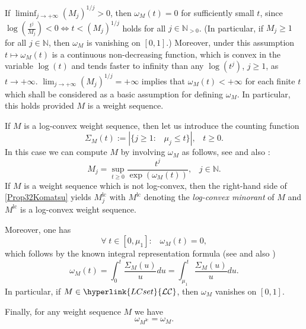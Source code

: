 \documentclass[10pt]{amsart}%
\numberwithin{equation}{section}
\theoremstyle{plain}
\newcommand{\NN}{\mathbb{N}}
\let\on=\operatorname
\begin{document}
If $\liminf_{j\rightarrow+\infty}(M_j)^{1/j}>0$, then $\omega_M(t)=0$ for sufficiently small $t$, since $\log\left(\frac{t^j}{M_j}\right)<0\Leftrightarrow t<(M_j)^{1/j}$ holds for all $j\in\NN_{>0}$. (In particular, if $M_j\ge 1$ for all $j\in\NN$, then $\omega_M$ is vanishing on $[0,1]$.) Moreover, under this assumption $t\mapsto\omega_M(t)$ is a continuous non-decreasing function, which is convex in the variable $\log(t)$ and tends faster to infinity than any $\log(t^j)$, $j\ge 1$, as $t\rightarrow+\infty$. $\lim_{j\rightarrow+\infty}(M_j)^{1/j}=+\infty$ implies that $\omega_M(t)<+\infty$ for each finite $t$ which shall be considered as a basic assumption for defining $\omega_M$. In particular, this holds provided $M$ is a weight sequence.\vspace{6pt}

If $M$ is a log-convex weight sequence, then let us introduce the counting function
\begin{equation}\label{counting}
\Sigma_{M}(t):=|\{j\ge 1:\;\;\;\mu_j\le t\}|,\;\;\;t\ge 0.
\end{equation}
In this case we can compute $M$ by involving $\omega_M$ as follows, see \cite[Chapitre I, 1.4, 1.8]{mandelbrojtbook} and also \cite[Prop. 3.2]{Komatsu73}:
\begin{equation}\label{Prop32Komatsu}
M_j=\sup_{t\ge 0}\frac{t^j}{\exp(\omega_{M}(t))},\;\;\;j\in\NN.
\end{equation}
If $M$ is a weight sequence which is not log-convex, then the right-hand side of \eqref{Prop32Komatsu} yields $M^{\on{lc}}_j$ with $M^{\on{lc}}$ denoting the {\itshape log-convex minorant} of $M$ and $M^{\on{lc}}$ is a log-convex weight sequence.

Moreover, one has
\begin{equation*}\label{assovanishing}
\forall\;t\in[0,\mu_1]:\;\;\;\omega_M(t)=0,
\end{equation*}
which follows by the known integral representation formula (see \cite[1.8. III]{mandelbrojtbook} and also \cite[$(3.11)$]{Komatsu73})
\begin{equation}\label{assointrepr}
\omega_M(t)=\int_0^t\frac{\Sigma_M(u)}{u}du=\int_{\mu_1}^t\frac{\Sigma_M(u)}{u}du.
\end{equation}
In particular, if $M\in\hyperlink{LCset}{\mathcal{LC}}$, then $\omega_M$ vanishes on $[0,1]$.

Finally, for any weight sequence $M$ we have
\begin{equation}\label{lcminorantnodifference}
\omega_{M^{\on{lc}}}=\omega_{M}.
\end{equation}
\end{document}
